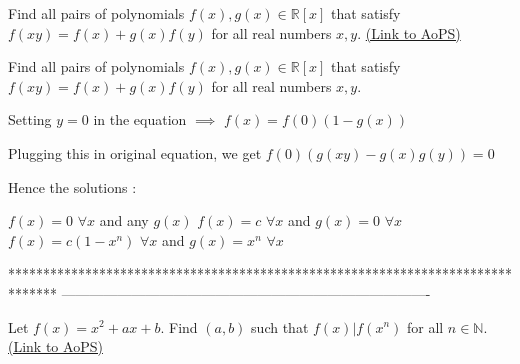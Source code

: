 \begin{problem}
	Find all pairs of polynomials $f(x), g(x)\in\mathbb{R}[x]$ that satisfy $ f (xy) = f (x) +g(x)f (y)$ for all real numbers $x, y$.
	\flushright \href{https://artofproblemsolving.com/community/c6h368189}{(Link to AoPS)}
\end{problem}



\begin{solution}
	\begin{tcolorbox}Find all pairs of polynomials $f(x), g(x)\in\mathbb{R}[x]$ that satisfy $ f (xy) = f (x) +g(x)f (y)$ for all real numbers $x, y$.\end{tcolorbox}
Setting $y=0$ in the equation $\implies$ $f(x)=f(0)(1-g(x))$

Plugging this in original equation, we get $f(0)(g(xy)-g(x)g(y))=0$

Hence the solutions :

$f(x)=0$ $\forall x$ and any $g(x)$
$f(x)=c$ $\forall x$ and $g(x)=0$ $\forall x$
$f(x)=c(1-x^n)$ $\forall x$ and $g(x)=x^n$ $\forall x$
\end{solution}
*******************************************************************************
-------------------------------------------------------------------------------

\begin{problem}
	Let $f(x)=x^2+ax+b$. Find $(a,b)$ such that $f(x)|f(x^n)$ for all $n\in{\mathbb{N}}.$
	\flushright \href{https://artofproblemsolving.com/community/c6h368325}{(Link to AoPS)}
\end{problem}




